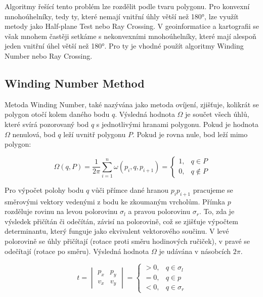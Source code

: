 \documentclass[11pt, a4paper]{article}
\begin{document}
Algoritmy řešící tento problém lze rozdělit podle tvaru polygonu. Pro konvexní mnohoúhelníky, tedy ty, které nemají vnitřní úhly větší než 180°, lze využít metody jako Half-plane Test nebo Ray Crossing. V geoinformatice a kartografii se však mnohem častěji setkáme s nekonvexními mnohoúhelníky, které mají alespoň jeden vnitřní úhel větší než 180°. Pro ty je vhodné použít algoritmy Winding Number nebo Ray Crossing.

\subsection{Winding Number Method} 

Metoda Winding Number, také nazývána jako metoda ovíjení, zjišťuje, kolikrát se polygon otočí kolem daného bodu $q$. Výsledná hodnota $\Omega$ je součet všech úhlů, které svírá pozorovaný bod $q$ s jednotlivými hranami polygonu. Pokud je hodnota $\Omega$ nenulová, bod $q$ leží uvnitř polygonu $P$. Pokud je rovna nule, bod leží mimo polygon:

\begin{equation} 
\Omega(q, P) = \frac{1}{2\pi} \sum_{i=1}^{n} \omega(p_i, q, p_{i+1}) = 
\begin{cases} 
1, & q \in P \\ 
0, & q \notin P 
\end{cases} 
\end{equation}

Pro výpočet polohy bodu $q$ vůči přímce dané hranou $p_i p_{i+1}$ pracujeme se směrovými vektory vedenými z bodu ke zkoumaným vrcholům. Přímka $p$ rozděluje rovinu na levou polorovinu $\sigma_l$ a pravou polorovinu $\sigma_r$. To, zda je výsledek přičítán či odečítán, závisí na polorovině, což se zjišťuje výpočtem determinantu, který funguje jako ekvivalent vektorového součinu. V levé polorovině se úhly přičítají (rotace proti směru hodinových ručiček), v pravé se odečítají (rotace po směru). Výsledná hodnota $\Omega$ je udávána v násobcích $2\pi$.

\begin{equation} 
t = \begin{vmatrix} p_x & p_y \\ v_x & v_y \end{vmatrix} = 
\begin{cases} 
> 0, & q \in \sigma_l \\ 
= 0, & q \in p \\ 
< 0, & q \in \sigma_r 
\end{cases} 
\end{equation}
\end{document}
